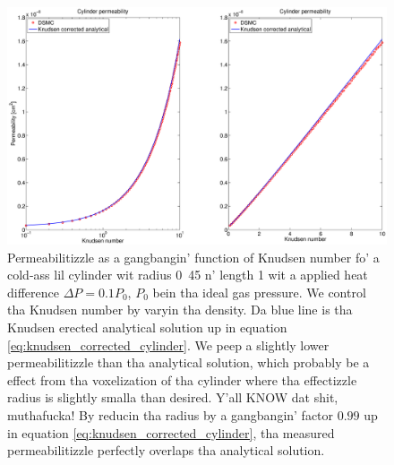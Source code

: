 \begin{figure}[H]
\begin{center}
\includegraphics[width=\textwidth, trim=5cm 0cm 5cm 0cm, clip]{DSMC/figures/cylinder_knudsen_permeability.eps}
\end{center}
\caption{Permeabilitizzle as a gangbangin' function of Knudsen number fo' a cold-ass lil cylinder wit radius \unit{0.45}{\micro\meter} n' length \unit{1}{\micro\meter} wit a applied heat difference $\Delta P = 0.1P_0$, $P_0$ bein tha ideal gas pressure. We control tha Knudsen number by varyin tha density. Da blue line is tha Knudsen erected analytical solution up in equation \eqref{eq:knudsen_corrected_cylinder}. We peep a slightly lower permeabilitizzle than tha analytical solution, which probably be a effect from tha voxelization of tha cylinder where tha effectizzle radius is slightly smalla than desired. Y'all KNOW dat shit, muthafucka! By reducin tha radius by a gangbangin' factor $0.99$ up in equation \eqref{eq:knudsen_corrected_cylinder}, tha measured permeabilitizzle perfectly overlaps tha analytical solution.}
\label{fig:one_cylinder_varying_knudsen}
\end{figure}

